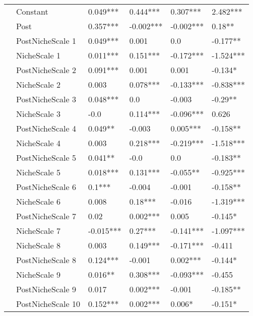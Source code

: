 \begin{longtable}[h!]{llllll}
\bottomrule
\endlastfoot
\multirow{40}{*}{Full} & Constant &            0.049*** &    0.444*** &   0.307*** &   2.482*** \\
     & Post &            0.357*** &   -0.002*** &  -0.002*** &     0.18** \\
     & PostNicheScale 1 &            0.049*** &       0.001 &        0.0 &   -0.177** \\
     & NicheScale 1 &            0.011*** &    0.151*** &  -0.172*** &  -1.524*** \\
     & PostNicheScale 2 &            0.091*** &       0.001 &      0.001 &    -0.134* \\
     & NicheScale 2 &               0.003 &    0.078*** &  -0.133*** &  -0.838*** \\
     & PostNicheScale 3 &            0.048*** &         0.0 &     -0.003 &    -0.29** \\
     & NicheScale 3 &                -0.0 &    0.114*** &  -0.096*** &      0.626 \\
     & PostNicheScale 4 &             0.049** &      -0.003 &   0.005*** &   -0.158** \\
     & NicheScale 4 &               0.003 &    0.218*** &  -0.219*** &  -1.518*** \\
     & PostNicheScale 5 &             0.041** &        -0.0 &        0.0 &   -0.183** \\
     & NicheScale 5 &            0.018*** &    0.131*** &   -0.055** &  -0.925*** \\
     & PostNicheScale 6 &              0.1*** &      -0.004 &     -0.001 &   -0.158** \\
     & NicheScale 6 &               0.008 &     0.18*** &     -0.016 &  -1.319*** \\
     & PostNicheScale 7 &                0.02 &    0.002*** &      0.005 &    -0.145* \\
     & NicheScale 7 &           -0.015*** &     0.27*** &  -0.141*** &  -1.097*** \\
     & NicheScale 8 &               0.003 &    0.149*** &  -0.171*** &     -0.411 \\
     & PostNicheScale 8 &            0.124*** &      -0.001 &   0.002*** &    -0.144* \\
     & NicheScale 9 &             0.016** &    0.308*** &  -0.093*** &     -0.455 \\
     & PostNicheScale 9 &               0.017 &    0.002*** &     -0.001 &   -0.185** \\
     & PostNicheScale 10 &            0.152*** &    0.002*** &     0.006* &    -0.151* \\

\end{longtable}
